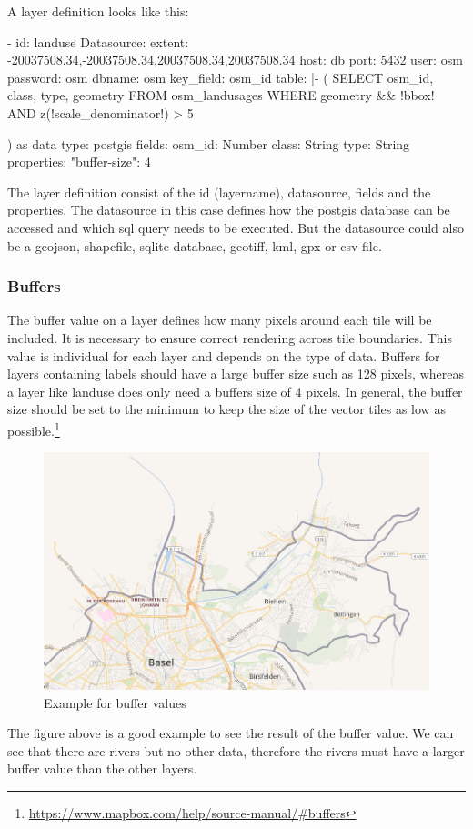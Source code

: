 A layer definition looks like this:
\begin{yamlcode}
- id: landuse
Datasource:
    extent: -20037508.34,-20037508.34,20037508.34,20037508.34
    host: db
    port: 5432
    user: osm
    password: osm
    dbname: osm
    key_field: osm_id
    table: |-
        (
            SELECT osm_id, class, type, geometry
            FROM osm_landusages
            WHERE geometry && !bbox!
            AND z(!scale_denominator!) > 5
        
        ) as data
    type: postgis
fields:
    osm_id: Number
    class: String
    type: String
properties:
    "buffer-size": 4
\end{yamlcode}
The layer definition consist of the id (layername), datasource, fields and the properties. The datasource in this case defines how the postgis database can be accessed and which sql query needs to be executed. But the datasource could also be a geojson, shapefile, sqlite database, geotiff, kml, gpx or csv file.


\subsubsection{Buffers}\label{buffers}
The buffer value on a layer defines how many pixels around each tile will be included. It is necessary to ensure correct rendering across tile boundaries. This value is individual for each layer and depends on the type of data. Buffers for layers containing labels should have a large buffer size such as 128 pixels, whereas a layer like landuse does only need a buffers size of 4 pixels. In general, the buffer size should be set to the minimum to keep the size of the vector tiles as low as possible.\footnote{\url{https://www.mapbox.com/help/source-manual/\#buffers}}\\

\begin{figure}[h]
  \centering
  \includegraphics[width=1\textwidth]{images/buffer.png}
  \caption{Example for buffer values}
\end{figure}
The figure above is a good example to see the result of the buffer value. We can see that there are rivers but no other data, therefore the rivers must have a larger buffer value than the other layers.

